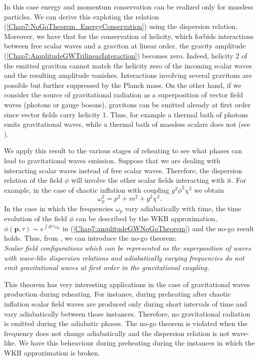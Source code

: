 \documentclass[11pt,a4paper,twoside]{book}
\begin{document}
In this case energy and momentum conservation can be realized only for massless particles. We can derive this exploting the relation (\ref{Chap7:NoGoTheorem_EnergyConservation}) using the dispersion relation. Moreover, we have that for the conservation of helicity, which forbids interactions between free scalar waves and a graviton  at linear order, the gravity amplitude (\ref{Chap7:AmplitudeGWTrilinearInteraction}) becomes zero. Indeed, helicity 2 of the emitted graviton cannot match the helicity zero of the incoming scalar waves and the resulting amplitude vanishes. Interactions involving several gravitons are possible but further suppressed by the Planck mass. On the other hand, if we consider the source of gravitational radiation as a superposition of vector field waves (photons or gauge bosons), gravitons can be emitted already at first order  since  vector fields carry helicity 1. Thus, for example a thermal bath of photons emits gravitational waves, while a thermal bath of massless scalars does not (see \cite{Chap7:GreenMethod}).

We apply this result to the various stages of reheating to see what phases can lead to gravitational waves emission. Suppose that we are dealing with interacting scalar waves instead of free scalar waves. Therefore, the dispersion relation of the field $\phi$ will involve the other scalar fields interacting with it. For example, in the case of chaotic inflation with coupling $ g^{2}\phi^{2}\chi^{2} $ we obtain
\begin{equation}
\label{Chap7:dispersionRelationWithCoupling}
\omega_{p}^{2}=p^{2}+m^{2}+g^{2}\chi^{2}.
\end{equation}
In the case in which the frequencies $\omega_{p}$ vary adiabatically with time, the time evolution of the  field $\phi$ can be described by the WKB approximation, $ \phi(\textbf{p},\tau) \sim e^{\int d\tau' \omega_{p}} $ in (\ref{Chap7:amplitudeGWNoGoTheorem}) and the no-go result holds. Thus, from \cite{Chap7:GreenMethod}, we can introduce the no-go theorem:\\
\textit{Scalar field configurations which can be represented  as the superposition of waves with wave-like dispersion relations and adiabatically varying frequencies do not emit gravitational waves at first order in the gravitational coupling.}

This theorem has very interesting applications in the case of gravitational waves production during reheating. For instance, during preheating after chaotic inflation scalar field waves are produced only during short intervals of time and vary adiabatically between those instances. Therefore, no gravitational radiation is emitted during the adiabatic phases. The no-go theorem is violated when the frequency does not change adiabatically and the dispersion relation is not wave-like. We have this beheaviour during preheating during the instances in which the WKB approximation is broken.
\end{document}
